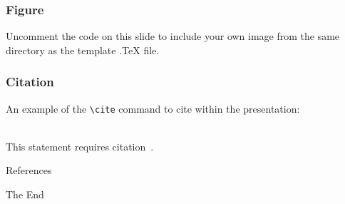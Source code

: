 \documentclass{beamer}
\begin{document}

\begin{frame}
  \frametitle{Figure}
  Uncomment the code on this slide to include your own image from the same directory as the template .TeX file.
\end{frame}


\begin{frame}[fragile] %
  \frametitle{Citation}
  An example of the \verb|\cite| command to cite within the presentation:\\~

  This statement requires citation~\cite{shamir2010learning}.
\end{frame}



\begin{frame}[allowframebreaks]{References}
  
  
\end{frame}


\begin{frame}
  \Huge{\centerline{The End}}
\end{frame}

\end{document}
